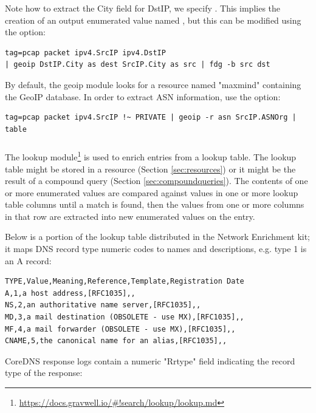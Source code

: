 Note how to extract the City field for DstIP, we specify . This implies the creation of an output enumerated value named , but this can be modified using the  option:

\begin{verbatim}
tag=pcap packet ipv4.SrcIP ipv4.DstIP 
| geoip DstIP.City as dest SrcIP.City as src | fdg -b src dst
\end{verbatim}

By default, the geoip module looks for a resource named "maxmind" containing the GeoIP database. In order to extract ASN information, use the  option:

\begin{verbatim}
tag=pcap packet ipv4.SrcIP !~ PRIVATE | geoip -r asn SrcIP.ASNOrg | table
\end{verbatim}

\subsubsection{\emph{}}

The lookup module\footnote{\href{https://docs.gravwell.io/\#!search/lookup/lookup.md}{https://docs.gravwell.io/\#!search/lookup/lookup.md}} is used to enrich entries from a lookup table. The lookup table might be stored in a resource (Section \ref{sec:resources}) or it might be the result of a compound query (Section \ref{sec:compoundqueries}). The contents of one or more enumerated values are compared against values in one or more lookup table columns until a match is found, then the values from one or more columns in that row are extracted into new enumerated values on the entry.

Below is a portion of the  lookup table distributed in the Network Enrichment kit; it maps DNS record type numeric codes to names and descriptions, e.g. type 1 is an A record:

\begin{verbatim}
TYPE,Value,Meaning,Reference,Template,Registration Date
A,1,a host address,[RFC1035],,
NS,2,an authoritative name server,[RFC1035],,
MD,3,a mail destination (OBSOLETE - use MX),[RFC1035],,
MF,4,a mail forwarder (OBSOLETE - use MX),[RFC1035],,
CNAME,5,the canonical name for an alias,[RFC1035],,
\end{verbatim}

CoreDNS response logs contain a numeric "Rrtype" field indicating the record type of the response:

